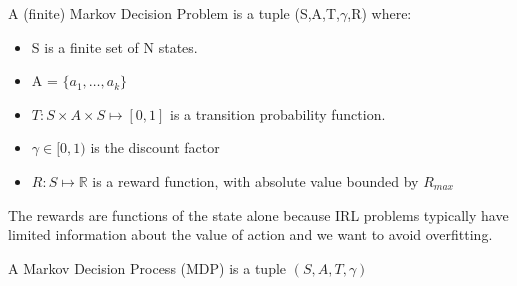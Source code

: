 \documentclass[a4paper,11pt]{article}
\numberwithin{equation}{section}
\begin{document}
A (finite) Markov Decision Problem is a tuple (S,A,T,$\gamma$,R) where:\newline 
\begin{itemize} 
\item S is a finite set of N states. 
\item A = $\{a_{1},\ldots,a_{k}\}$
\item $T : S \times A \times S \mapsto [0,1]$ is a transition probability function.
\item $\gamma \in [0,1)$ is the discount factor
\item $R : S\mapsto \mathbb{R}$ is a reward function, with absolute value bounded by $R_{max}$
\end{itemize}
The rewards are functions of the state alone because IRL problems typically have limited information about the value of action and we want to avoid overfitting.

A Markov Decision Process (MDP) is a tuple $(S,A,T,\gamma)$
\end{document}
